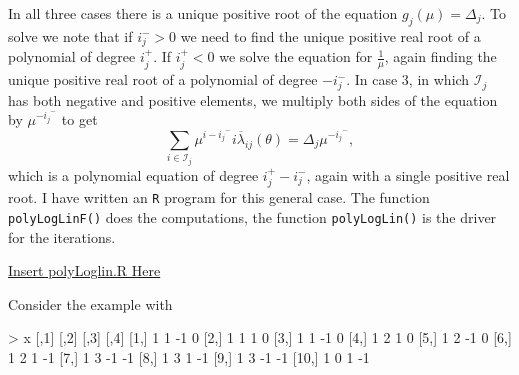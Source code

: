\documentclass[
  12pt,
]{book}
\newenvironment{Shaded}{\begin{snugshade}}{\end{snugshade}}
\newcommand{\DecValTok}[1]{\textcolor[rgb]{0.00,0.00,0.81}{#1}}
\newcommand{\NormalTok}[1]{#1}
\newcommand{\SpecialCharTok}[1]{\textcolor[rgb]{0.00,0.00,0.00}{#1}}
\begin{document}
In all three cases there is a unique positive root of the equation \(g_j(\mu)=\Delta_j\). To solve we note that if \(i_j^->0\) we need to find the unique positive real root of a polynomial of degree \(i_j^+\). If \(i_j^+<0\) we solve the equation for \(\frac{1}{\mu}\), again finding the unique positive real root of a polynomial of degree \(-i_j^-\). In case 3, in which \(\mathcal{I}_j\) has both negative and positive elements, we multiply both sides of the equation by \(\mu^{-{i_j}^-}\) to get
\[\sum_{i\in\mathcal{I}_j}\mu^{i-{i_j}^-} i\overline{\lambda}_{ij}(\theta)=\Delta_j\mu^{-{i_j}^-},\]
which is a polynomial equation of degree \(i_j^+-i_j^-\), again with a single positive real root. I have written an \texttt{R} program for this general case.
The function \texttt{polyLogLinF()} does the computations, the function \texttt{polyLogLin()} is the driver for the iterations.

\href{../code/polyLoglin.R}{Insert polyLoglin.R Here}

Consider the example with

\begin{Shaded}
\begin{Highlighting}[]
\SpecialCharTok{\textgreater{}}\NormalTok{ x}
\NormalTok{      [,}\DecValTok{1}\NormalTok{] [,}\DecValTok{2}\NormalTok{] [,}\DecValTok{3}\NormalTok{] [,}\DecValTok{4}\NormalTok{]}
\NormalTok{ [}\DecValTok{1}\NormalTok{,]    }\DecValTok{1}    \DecValTok{1}   \SpecialCharTok{{-}}\DecValTok{1}    \DecValTok{0}
\NormalTok{ [}\DecValTok{2}\NormalTok{,]    }\DecValTok{1}    \DecValTok{1}    \DecValTok{1}    \DecValTok{0}
\NormalTok{ [}\DecValTok{3}\NormalTok{,]    }\DecValTok{1}    \DecValTok{1}   \SpecialCharTok{{-}}\DecValTok{1}    \DecValTok{0}
\NormalTok{ [}\DecValTok{4}\NormalTok{,]    }\DecValTok{1}    \DecValTok{2}    \DecValTok{1}    \DecValTok{0}
\NormalTok{ [}\DecValTok{5}\NormalTok{,]    }\DecValTok{1}    \DecValTok{2}   \SpecialCharTok{{-}}\DecValTok{1}    \DecValTok{0}
\NormalTok{ [}\DecValTok{6}\NormalTok{,]    }\DecValTok{1}    \DecValTok{2}    \DecValTok{1}   \SpecialCharTok{{-}}\DecValTok{1}
\NormalTok{ [}\DecValTok{7}\NormalTok{,]    }\DecValTok{1}    \DecValTok{3}   \SpecialCharTok{{-}}\DecValTok{1}   \SpecialCharTok{{-}}\DecValTok{1}
\NormalTok{ [}\DecValTok{8}\NormalTok{,]    }\DecValTok{1}    \DecValTok{3}    \DecValTok{1}   \SpecialCharTok{{-}}\DecValTok{1}
\NormalTok{ [}\DecValTok{9}\NormalTok{,]    }\DecValTok{1}    \DecValTok{3}   \SpecialCharTok{{-}}\DecValTok{1}   \SpecialCharTok{{-}}\DecValTok{1}
\NormalTok{[}\DecValTok{10}\NormalTok{,]    }\DecValTok{1}    \DecValTok{0}    \DecValTok{1}   \SpecialCharTok{{-}}\DecValTok{1}
\end{Highlighting}
\end{Shaded}
\end{document}
